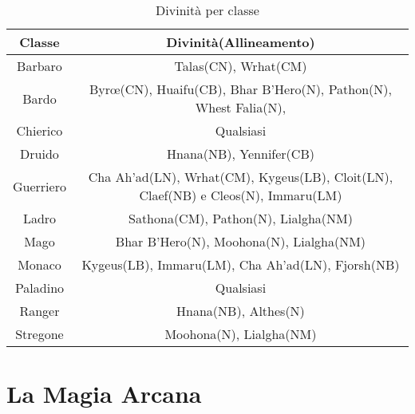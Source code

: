 \documentclass[a4paper]{report}
\begin{document}
\begin{table}[h]
\centering
\begin{tabular}{||c|c||}
\hline
\bf Classe & \bf Divinità(Allineamento)\\
\hline
Barbaro & Talas(CN), Wrhat(CM)\\
\hline
Bardo & \quad Byrœ(CN), Huaifu(CB), Bhar B'Hero(N), Pathon(N), Whest Falia(N), \quad \\
\hline
Chierico & Qualsiasi\\
\hline
Druido & Hnana(NB), Yennifer(CB)\\
\hline
Guerriero & Cha Ah'ad(LN), Wrhat(CM), Kygeus(LB), Cloit(LN), Claef(NB) e Cleos(N), Immaru(LM)\\
\hline
Ladro & Sathona(CM), Pathon(N), Lialgha(NM)\\
\hline
Mago & Bhar B'Hero(N), Moohona(N), Lialgha(NM)\\
\hline
Monaco & Kygeus(LB), Immaru(LM), Cha Ah'ad(LN), Fjorsh(NB)\\
\hline
Paladino & Qualsiasi\\
\hline
Ranger & Hnana(NB), Althes(N)\\
\hline
Stregone & Moohona(N), Lialgha(NM)\\
\hline
\end{tabular}
\caption{Divinità per classe}
\end{table}

\chapter{La Magia Arcana}
\end{document}
